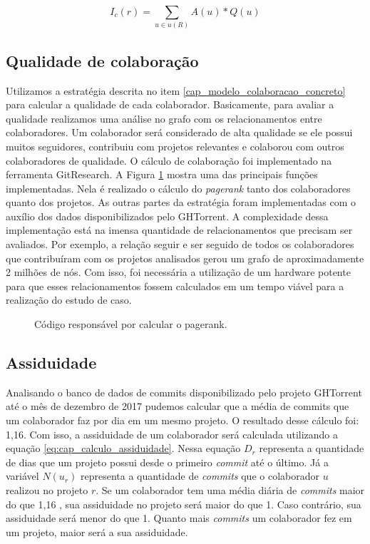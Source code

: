\begin{equation}
\label{eq:cap_calculo_indice_colaboracao}
I_c(r) =  \sum_{u  \in u(R) } A(u) * Q(u)
\end{equation}





\subsection{Qualidade de colaboração}


Utilizamos a estratégia descrita no item \ref{cap_modelo_colaboracao_concreto} para calcular a qualidade de cada colaborador. Basicamente, para avaliar a qualidade realizamos uma análise no grafo com os relacionamentos entre colaboradores. Um colaborador será considerado de alta qualidade se ele possui muitos seguidores, contribuiu com projetos relevantes e colaborou com outros colaboradores de qualidade.  O cálculo de colaboração foi implementado na ferramenta GitResearch.  A Figura \ref{fig:codigo_calcula_pagerank} mostra uma das principais funções implementadas.  Nela é realizado o cálculo do \textit{pagerank} tanto dos colaboradores quanto dos projetos. As outras partes da estratégia foram implementadas com o auxílio dos dados disponibilizados pelo GHTorrent. A complexidade dessa implementação está na imensa quantidade de relacionamentos que precisam ser avaliados. Por exemplo, a relação seguir e ser seguido de todos os colaboradores que contribuíram com os projetos analisados gerou um grafo de aproximadamente 2 milhões de nós. Com isso, foi necessária a utilização de um hardware potente para que esses relacionamentos fossem calculados em um tempo viável para a realização do estudo de caso. 

 \begin{figure}[H]
  \centering
  \caption{Código responsável por calcular o pagerank.}
  \label{fig:codigo_calcula_pagerank} 
\end{figure}


\subsection{Assiduidade}

Analisando o banco de dados de commits disponibilizado pelo projeto GHTorrent até o mês de dezembro de 2017 pudemos calcular que a média de commits que um colaborador faz por dia em um mesmo projeto. O resultado desse cálculo foi: 1,16. Com isso, a assiduidade de um colaborador será calculada utilizando a equação \ref{eq:cap_calculo_assiduidade}. Nessa equação $D_r$ representa a quantidade de dias que um projeto possui desde o primeiro \textit{commit} até o último.  Já a variável $N(u_r)$ representa a quantidade de \textit{commits} que o colaborador $u$ realizou no projeto $r$. Se um colaborador tem uma média diária de \textit{commits} maior do que 1,16 , sua assiduidade no projeto será maior do que 1. Caso contrário, sua assiduidade será menor do que 1. Quanto mais \textit{commits} um colaborador fez em um projeto, maior será a sua assiduidade. 

